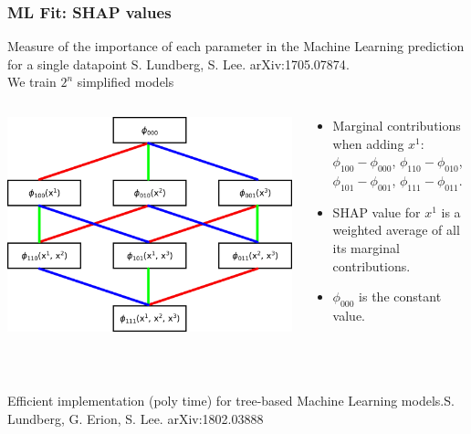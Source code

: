 \documentclass[mathserif, 10pt, dvipsnames]{beamer}
\newcommand\colorcite[1]{{\scriptsize\color{unizarblue}#1}}
\begin{document}
\begin{frame}\frametitle{ML Fit: SHAP values}

Measure of the importance of each parameter in the Machine Learning
prediction for a single datapoint \colorcite{S. Lundberg,
    S. Lee. arXiv:1705.07874}.\\[0.3em]

We train $2^n$ simplified models\\[0.3em]

    \begin{columns}
        \begin{column}{0.5\textwidth}
            \includegraphics[width=\columnwidth]{figures/shapgraph.png}
        \end{column}
        \begin{column}{0.5\textwidth}
            \begin{itemize}
                \item Marginal contributions {\color{red} when adding $x^1$}: $\phi_{100}-\phi_{000}$, $\phi_{110}-\phi_{010}$, $\phi_{101}-\phi_{001}$, $\phi_{111} - \phi_{011}$.
                \item SHAP value {\color{red}for $x^1$} is a weighted average of all its marginal contributions.
\item $\phi_{000}$ is the constant value.\\[0.5em]
            \end{itemize}
        \end{column}
    \end{columns}

~

Efficient implementation (poly time) for tree-based Machine Learning models.\colorcite{S. Lundberg, G. Erion, S. Lee. arXiv:1802.03888}

\end{frame}
\end{document}
